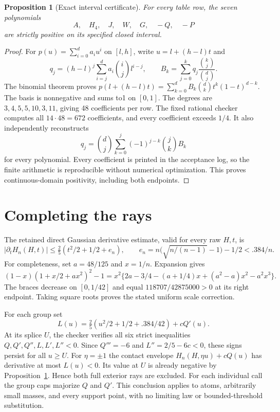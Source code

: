 \documentclass[11pt]{article}
\newtheorem{proposition}[theorem]{Proposition}
\begin{document}
\begin{proposition}[Exact interval certificate]\label{certificate}
For every table row, the seven polynomials
\[ A,\quad H_4,\quad J,\quad W,\quad G,\quad -Q,\quad -P \]
are strictly positive on its specified closed interval.
\end{proposition}
\begin{proof}
For $p(u)=\sum_{i=0}^d a_i u^i$ on $[l,h]$, write $u=l+(h-l)t$ and
\[
 q_j=(h-l)^j\sum_{i=j}^d a_i\binom ij l^{i-j},\qquad
 B_k=\sum_{j=0}^k q_j\frac{\binom kj}{\binom dj}.
\]
The binomial theorem proves
$p(l+(h-l)t)=\sum_{k=0}^d B_k\binom dk t^k(1-t)^{d-k}$.
The basis is nonnegative and sums to1 on $[0,1]$.
The degrees are $3,4,5,5,10,3,11$, giving 48 coefficients per row.
The fixed rational checker computes all $14\cdot48=672$ coefficients,
and every coefficient exceeds $1/4$. It also independently reconstructs
\[
 q_j=\binom dj\sum_{k=0}^j(-1)^{j-k}\binom jk B_k
\]
for every polynomial. Every coefficient is printed in the acceptance log,
so the finite arithmetic is reproducible without numerical optimization.
This proves continuous-domain positivity, including both endpoints.
\end{proof}

\section{Completing the rays}
The retained direct Gaussian derivative estimate, valid for every raw $H,t$, is
\[
 |\partial_tH_n(H,t)|\le\tfrac25(t^2/2+1/2+e_n),\qquad
 e_n=n\bigl(\sqrt{n/(n-1)}-1\bigr)-1/2<.384/n.
\]
For completeness, set $a=48/125$ and $x=1/n$. Expansion gives
\[
 (1-x)(1+x/2+ax^2)^2-1
 =x^2\{2a-3/4-(a+1/4)x+(a^2-a)x^2-a^2x^3\}.
\]
The braces decrease on $[0,1/42]$ and equal
$118707/42875000>0$ at its right endpoint. Taking square roots proves the
stated uniform scale correction.

For each group set
\[
 L(u)=\tfrac25(u^2/2+1/2+.384/42)+cQ'(u).
\]
At its splice $U$, the checker verifies all six strict inequalities
$Q,Q',Q'',L,L',L''<0$. Since $Q'''=-6$ and $L''=2/5-6c<0$,
these signs persist for all $u\ge U$.
For $\eta=\pm1$ the contact envelope $H_n(H,\eta u)+cQ(u)$ has derivative
at most $L(u)<0$. Its value at $U$ is already negative by
Proposition~\ref{certificate}. Hence both full exterior rays are excluded.
For each individual call the group caps majorize $Q$ and $Q'$.
This conclusion applies to atoms, arbitrarily small masses, and every
support point, with no limiting law or bounded-threshold substitution.
\end{document}
